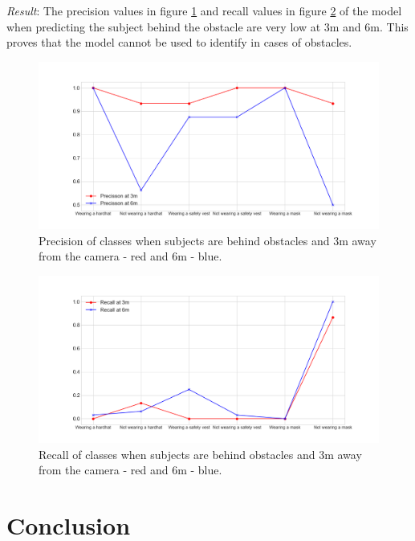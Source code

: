 \documentclass[conference]{IEEEtran}
\begin{document}
\emph{Result}: The precision values in figure \ref{fig:3_6_precision} and recall values in figure \ref{fig:3_6_recall} of the model when predicting the subject behind the obstacle are very low at 3m and 6m. This proves that the model cannot be used to identify in cases of obstacles.
\begin{figure}[ht]
	\centerline{\includegraphics[scale=0.3]{images/3_6_precision.png}}
  	\caption{Precision of classes when subjects are behind obstacles and 3m away from the camera - red and 6m - blue.}
  	\label{fig:3_6_precision}
\end{figure}
\begin{figure}[ht]
	\centerline{\includegraphics[scale=0.3]{images/3_6_recall.png}}
  	\caption{Recall of classes when subjects are behind obstacles and 3m away from the camera - red and 6m - blue.}
  	\label{fig:3_6_recall}
\end{figure}
\section*{Conclusion}
\end{document}
